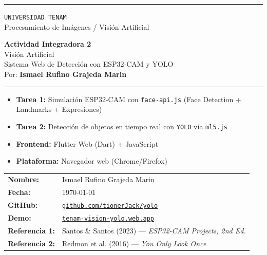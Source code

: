 \documentclass[12pt,a4paper]{article}
\begin{document}
\begin{titlepage}
  \pagecolor{tenam-dark}
  \color{white}
  \centering
  \vspace*{1cm}

  {\color{tenam-cyan}\rule{\linewidth}{2pt}}
  \vspace{0.5cm}

  {\fontsize{11}{13}\selectfont\color{tenam-light}\texttt{UNIVERSIDAD TENAM}}\\[0.3cm]
  {\fontsize{10}{12}\selectfont\color{gray} Procesamiento de Imágenes / Visión Artificial}

  \vspace{1.2cm}
  {\fontsize{26}{30}\selectfont\bfseries\color{white} Actividad Integradora 2}\\[0.5cm]
  {\fontsize{18}{22}\selectfont\color{tenam-cyan} Visión Artificial}\\[0.3cm]
  {\fontsize{14}{18}\selectfont\color{tenam-light} Sistema Web de Detección con ESP32-CAM y YOLO}\\[0.5cm]
  {\fontsize{12}{14}\selectfont\color{white} Por: \textbf{Ismael Rufino Grajeda Marin}}

  \vspace{1.5cm}
  {\color{tenam-cyan}\rule{8cm}{0.6pt}}
  \vspace{0.8cm}

  \begin{tcolorbox}[infobox, width=12cm, title={\faCode\ Tecnologías Implementadas}]
    \begin{itemize}[leftmargin=*, itemsep=4pt]
      \item \textbf{Tarea 1:} Simulación ESP32-CAM con \texttt{face-api.js} (Face Detection + Landmarks + Expresiones)
      \item \textbf{Tarea 2:} Detección de objetos en tiempo real con \texttt{YOLO} vía \texttt{ml5.js}
      \item \textbf{Frontend:} Flutter Web (Dart) + JavaScript
      \item \textbf{Plataforma:} Navegador web (Chrome/Firefox)
    \end{itemize}
  \end{tcolorbox}

  \vfill
  \begin{tabular}{ll}
    \textbf{Nombre:} & Ismael Rufino Grajeda Marin \\[4pt]
    \textbf{Fecha:} & \today \\[4pt]
    \textbf{GitHub:} & \href{https://github.com/tionerJack/yolo?tab=readme-ov-file}{\texttt{github.com/tionerJack/yolo}} \\[4pt]
    \textbf{Demo:} & \href{https://tenam-vision-yolo-1773976989.web.app/}{\texttt{tenam-vision-yolo.web.app}} \\[4pt]
    \textbf{Referencia 1:} & Santos \& Santos (2023) — \textit{ESP32-CAM Projects, 2nd Ed.} \\[4pt]
    \textbf{Referencia 2:} & Redmon et al. (2016) — \textit{You Only Look Once} \\[4pt]
  \end{tabular}


\end{titlepage}
\end{document}
